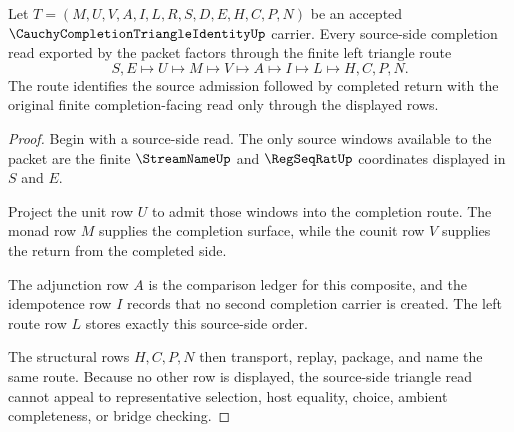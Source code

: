 \begin{theorem}
\label{thm:cauchy-completion-triangle-identity-left-route}
Let $T=(M,U,V,A,I,L,R,S,D,E,H,C,P,N)$ be an accepted $\CauchyCompletionTriangleIdentityUp$ carrier. Every source-side completion read exported by the packet factors through the finite left triangle route
$$
S,E\longmapsto U\longmapsto M\longmapsto V\longmapsto A\longmapsto I\longmapsto L\longmapsto H,C,P,N .
$$
The route identifies the source admission followed by completed return with the original finite completion-facing read only through the displayed rows.
\end{theorem}
\begin{proof}
Begin with a source-side read. The only source windows available to the packet are the finite $\StreamNameUp$ and $\RegSeqRatUp$ coordinates displayed in $S$ and $E$.

Project the unit row $U$ to admit those windows into the completion route. The monad row $M$ supplies the completion surface, while the counit row $V$ supplies the return from the completed side.

The adjunction row $A$ is the comparison ledger for this composite, and the idempotence row $I$ records that no second completion carrier is created. The left route row $L$ stores exactly this source-side order.

The structural rows $H,C,P,N$ then transport, replay, package, and name the same route. Because no other row is displayed, the source-side triangle read cannot appeal to representative selection, host equality, choice, ambient completeness, or bridge checking.
\end{proof}

